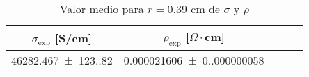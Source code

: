 \begin{table}[H]
    \centering
\begin{tabular}{ccccc}
\toprule
$\sigma_{\exp}$ [S/cm] & $\rho_{\exp}$ [$\Omega \cdot$cm] \\
\midrule
\num{46282.467(123.820)} & \num{0.000021606(0.000000058)} \\
\bottomrule
\end{tabular}
    \caption{Valor medio para $r=0.39$ cm de $\sigma$ y $\rho $}
    \label{Tab:S4}
\end{table}
